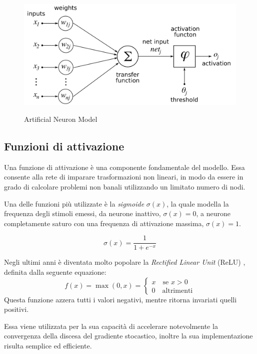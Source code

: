 \begin{figure}[htb]
	\centering
	{\includegraphics[width=.7\textwidth]{images/ArtificialNeuronModel}} 
	\caption{Artificial Neuron Model}
	\label{fig:Modello matematico di un neurone artificiale}
\end{figure}

\subsection{Funzioni di attivazione}
\label{subsec:fattivazione}
Una funzione di attivazione è una componente fondamentale del modello. Essa consente alla rete di imparare trasformazioni non lineari, in modo da essere in grado di calcolare problemi non banali utilizzando un limitato numero di nodi.

Una delle funzioni più utilizzate è la \emph{sigmoide} $\sigma(x)$, la quale modella la frequenza degli stimoli emessi, da neurone inattivo, $\sigma(x)=0$, a neurone completamente saturo con una frequenza di attivazione massima, $\sigma(x)=1$.

\begin{equation}
\sigma(x) = \frac{1}{1+e^{-x}}
\label{eq:sigmoid}
\end{equation}


Negli ultimi anni è diventata molto popolare la \emph{Rectified Linear Unit} (ReLU) \cite{nair2010rectified,hahnloser2000digital,hahnloser2003permitted,glorot2011deepsparse}, definita dalla seguente equazione:
\begin{equation}
f (x) = \max(0, x)= \begin{cases}
x \quad \mbox{se } x>0\\
0 \quad \mbox{altrimenti}
\end{cases}
\label{eq:relu}
\end{equation}
Questa funzione azzera tutti i valori negativi, mentre ritorna invariati quelli positivi.

Essa viene utilizzata per la sua capacità di accelerare notevolmente la convergenza della discesa del gradiente stocastico, inoltre la sua implementazione risulta semplice ed efficiente.

